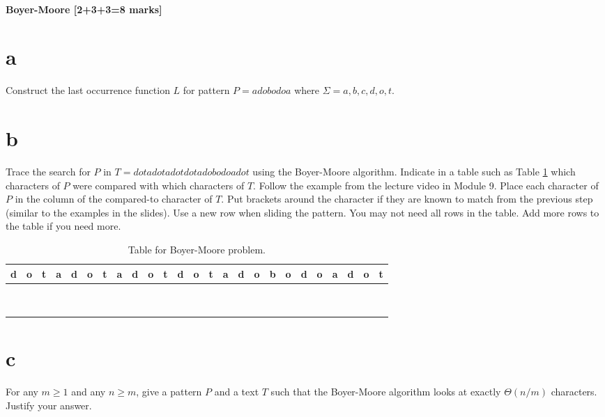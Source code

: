 \documentclass[12pt]{article}
\begin{document}
	\subsection{Boyer-Moore [2+3+3=8 marks]}
	\begin{enumerate}
		\part{a} Construct the last occurrence function $L$ for pattern $P=adobodoa$  where $\Sigma = {a,b,c,d,o,t}$.
		
		\part{b} Trace the search for $P$ in $T=dotadotadotdotadobodoadot$ using the Boyer-Moore algorithm.
		Indicate in a table such as Table \ref{bmtable} which characters of $P$ were compared with which characters of $T$.
		Follow the example from the lecture video in Module 9.
		Place each character of $P$ in the column of the compared-to character of $T$. 
		Put brackets around the character if they are known to match from the previous step (similar to the examples in the slides). 
		Use a new row when sliding the pattern. You may not need all rows in the table.  Add more rows to the table if you need more.
		\begin{table}[ht]
			\Large{
				\begin{center}
					\begin{tabular}{|c|c|c|c|c|c|c|c|c|c|c|c|c|c|c|c|c|c|c|c|c|c|c|c|c|}
						\hline
						d&o&t&a&d&o&t&a&d&o&t&d&o&t&a&d&o&b&o&d&o&a&d&o&t\\
						\hline
						\hline
						&&&&&&&&&&&&&&&&&&&&&&&&\\
						\hline
						&&&&&&&&&&&&&&&&&&&&&&&&\\
						\hline
						&&&&&&&&&&&&&&&&&&&&&&&&\\
						\hline
						&&&&&&&&&&&&&&&&&&&&&&&&\\
						\hline
						&&&&&&&&&&&&&&&&&&&&&&&&\\
						\hline
						&&&&&&&&&&&&&&&&&&&&&&&&\\
						\hline
						&&&&&&&&&&&&&&&&&&&&&&&&\\
						\hline
						&&&&&&&&&&&&&&&&&&&&&&&&\\
						\hline
						&&&&&&&&&&&&&&&&&&&&&&&&\\
						\hline
					\end{tabular}
			\end{center}}
			\caption{Table for Boyer-Moore problem.}\label{bmtable}
		\end{table}
		
		\part{c} For any $m\geq 1$ and any $n\geq m$, give a pattern $P$ and a text $T$ such that the Boyer-Moore algorithm looks at exactly $\Theta(n/m)$ characters.  
		Justify your answer.
		
	\end{enumerate}
	
\end{document}
